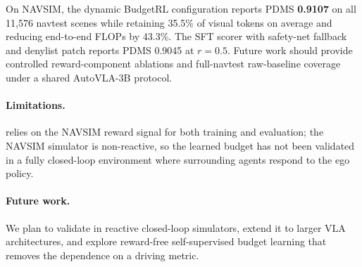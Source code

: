\documentclass[letterpaper]{article} %
\begin{document}
On NAVSIM, the dynamic BudgetRL configuration reports PDMS \textbf{0.9107}
on all 11,576 navtest scenes while retaining 35.5\% of visual tokens on average
and reducing end-to-end FLOPs by 43.3\%. The SFT scorer with safety-net fallback
and denylist patch reports PDMS 0.9045 at $r{=}0.5$. Future work should provide
controlled reward-component ablations and full-navtest raw-baseline coverage
under a shared AutoVLA-3B protocol.

\paragraph{Limitations.}
\ours{} relies on the NAVSIM reward signal for both training and evaluation; the
NAVSIM simulator is non-reactive, so the learned budget has not been validated
in a fully closed-loop environment where surrounding agents respond to the ego
policy.

\paragraph{Future work.}
We plan to validate \ours{} in reactive closed-loop simulators, extend it to
larger VLA architectures, and explore reward-free self-supervised budget
learning that removes the dependence on a driving metric.


\end{document}

